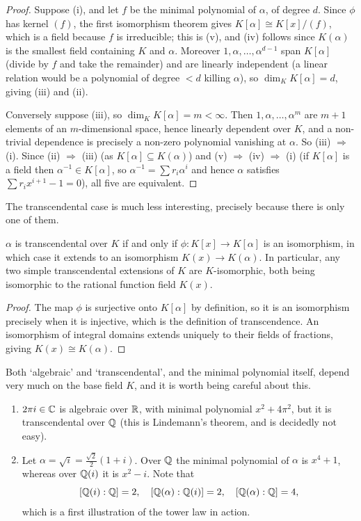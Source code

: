 \documentclass[a4paper]{scrartcl}
\begin{document}
\begin{proof}
	Suppose (i), and let $f$ be the minimal polynomial of $\alpha$, of degree $d$. Since $\phi$ has kernel $(f)$, the first isomorphism theorem gives $K[\alpha] \cong K[x]/(f)$, which is a field because $f$ is irreducible; this is (v), and (iv) follows since $K(\alpha)$ is the smallest field containing $K$ and $\alpha$. Moreover $1, \alpha, \dots, \alpha^{d-1}$ span $K[\alpha]$ (divide by $f$ and take the remainder) and are linearly independent (a linear relation would be a polynomial of degree $< d$ killing $\alpha$), so $\dim_K K[\alpha] = d$, giving (iii) and (ii).

	Conversely suppose (iii), so $\dim_K K[\alpha] = m < \infty$. Then $1, \alpha, \dots, \alpha^m$ are $m+1$ elements of an $m$-dimensional space, hence linearly dependent over $K$, and a non-trivial dependence is precisely a non-zero polynomial vanishing at $\alpha$. So (iii) $\Rightarrow$ (i). Since (ii) $\Rightarrow$ (iii) (as $K[\alpha] \subseteq K(\alpha)$) and (v) $\Rightarrow$ (iv) $\Rightarrow$ (i) (if $K[\alpha]$ is a field then $\alpha^{-1} \in K[\alpha]$, so $\alpha^{-1} = \sum r_i \alpha^i$ and hence $\alpha$ satisfies $\sum r_i x^{i+1} - 1 = 0$), all five are equivalent.
\end{proof}

The transcendental case is much less interesting, precisely because there is only one of them.

\begin{proposition}
	$\alpha$ is transcendental over $K$ if and only if $\phi : K[x] \to K[\alpha]$ is an isomorphism, in which case it extends to an isomorphism $K(x) \to K(\alpha)$. In particular, any two simple transcendental extensions of $K$ are $K$-isomorphic, both being isomorphic to the rational function field $K(x)$.
\end{proposition}

\begin{proof}
	The map $\phi$ is surjective onto $K[\alpha]$ by definition, so it is an isomorphism precisely when it is injective, which is the definition of transcendence. An isomorphism of integral domains extends uniquely to their fields of fractions, giving $K(x) \cong K(\alpha)$.
\end{proof}

\begin{remark}
	Both `algebraic' and `transcendental', and the minimal polynomial itself, depend very much on the base field $K$, and it is worth being careful about this.
	\begin{enumerate}[label=(\roman*)]
		\item $2\pi i \in \mathbb{C}$ is algebraic over $\mathbb{R}$, with minimal polynomial $x^2 + 4\pi^2$, but it is transcendental over $\mathbb{Q}$ (this is Lindemann's theorem, and is decidedly not easy).
		\item Let $\alpha = \sqrt{i} = \tfrac{\sqrt 2}{2}(1 + i)$. Over $\mathbb{Q}$ the minimal polynomial of $\alpha$ is $x^4 + 1$, whereas over $\mathbb{Q}(i)$ it is $x^2 - i$. Note that
		$$[\mathbb{Q}(i):\mathbb{Q}] = 2, \quad [\mathbb{Q}(\alpha):\mathbb{Q}(i)] = 2, \quad [\mathbb{Q}(\alpha):\mathbb{Q}] = 4,$$
		which is a first illustration of the tower law in action.
	\end{enumerate}
\end{remark}
\end{document}
